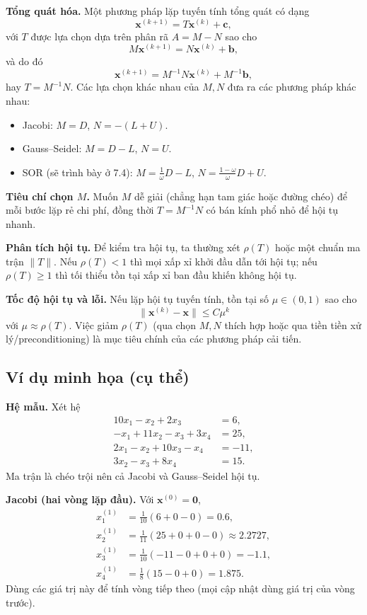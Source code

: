 \textbf{Tổng quát hóa.}
Một phương pháp lặp tuyến tính tổng quát có dạng
\[
\mathbf{x}^{(k+1)} = T\mathbf{x}^{(k)} + \mathbf{c},
\]
với $T$ được lựa chọn dựa trên phân rã $A=M-N$ sao cho
\[
M\mathbf{x}^{(k+1)} = N \mathbf{x}^{(k)} + \mathbf{b},
\]
và do đó
\[
\mathbf{x}^{(k+1)} = M^{-1}N \mathbf{x}^{(k)} + M^{-1}\mathbf{b},
\]
hay $T=M^{-1}N$. Các lựa chọn khác nhau của $M,N$ đưa ra các phương pháp khác nhau:
\begin{itemize}
  \item Jacobi: $M=D$, $N=-(L+U)$.
  \item Gauss--Seidel: $M=D-L$, $N=U$.
  \item SOR (sẽ trình bày ở 7.4): $M = \frac{1}{\omega}D - L$, $N = \frac{1-\omega}{\omega}D + U$.
\end{itemize}

\textbf{Tiêu chí chọn $M$.}
Muốn $M$ dễ giải (chẳng hạn tam giác hoặc đường chéo) để mỗi bước lặp rẻ chi phí, đồng thời $T=M^{-1}N$ có bán kính phổ nhỏ để hội tụ nhanh.

\textbf{Phân tích hội tụ.}
Để kiểm tra hội tụ, ta thường xét $\rho(T)$ hoặc một chuẩn ma trận $\|T\|$. Nếu $\rho(T)<1$ thì mọi xấp xỉ khởi đầu dẫn tới hội tụ; nếu $\rho(T)\ge1$ thì tối thiểu tồn tại xấp xỉ ban đầu khiến không hội tụ.

\textbf{Tốc độ hội tụ và lỗi.}
Nếu lặp hội tụ tuyến tính, tồn tại số $\mu\in(0,1)$ sao cho
\[
\|\mathbf{x}^{(k)}-\mathbf{x}\| \le C \mu^k
\]
với $\mu\approx\rho(T)$. Việc giảm $\rho(T)$ (qua chọn $M,N$ thích hợp hoặc qua tiền tiền xử lý/preconditioning) là mục tiêu chính của các phương pháp cải tiến.

\subsection{Ví dụ minh họa (cụ thể)}

\textbf{Hệ mẫu.} Xét hệ
\[
\begin{aligned}
10x_1 - x_2 + 2x_3 &= 6,\\
- x_1 + 11x_2 - x_3 + 3x_4 &= 25,\\
2x_1 - x_2 + 10x_3 - x_4 &= -11,\\
3x_2 - x_3 + 8x_4 &= 15.
\end{aligned}
\]
Ma trận là chéo trội nên cả Jacobi và Gauss--Seidel hội tụ.

\textbf{Jacobi (hai vòng lặp đầu).}
Với $\mathbf{x}^{(0)}=\mathbf{0}$,
\[
\begin{aligned}
x_1^{(1)} &= \tfrac{1}{10}(6 + 0 - 0) = 0.6,\\
x_2^{(1)} &= \tfrac{1}{11}(25 + 0 + 0 - 0) \approx 2.2727,\\
x_3^{(1)} &= \tfrac{1}{10}(-11 - 0 + 0 + 0) = -1.1,\\
x_4^{(1)} &= \tfrac{1}{8}(15 - 0 + 0) = 1.875.
\end{aligned}
\]
Dùng các giá trị này để tính vòng tiếp theo (mọi cập nhật dùng giá trị của vòng trước).

